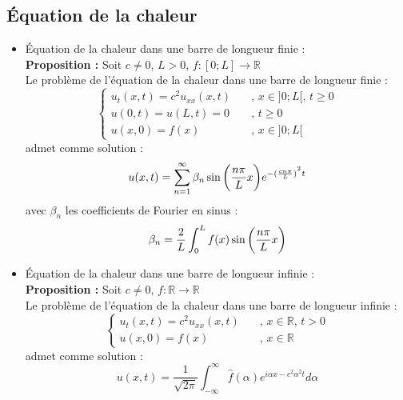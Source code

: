 \subsection{Équation de la chaleur}
\begin{itemize}
    \item Équation de la chaleur dans une barre de longueur finie : \\
    \textbf{Proposition :} Soit $c \neq 0$, $L > 0$, $f : [0;L] \to \mathbb{R}$ \\
    Le problème de l'équation de la chaleur dans une barre de longueur finie :
    $$
    \begin{cases}
        u_t(x,t) = c^2u_{xx}(x,t) \quad &\text{, }x \in ]0;L[\text{, }t \geq 0 \\
        u(0,t) = u(L,t) = 0 \quad &\text{, }t \geq 0 \\
        u(x,0) = f(x) \quad &\text{, }x \in ]0;L[
    \end{cases}
    $$
    admet comme solution :
    $$u(x,t) = \sum_{n=1}^{\infty}\beta_n \sin \bigg{(} \frac{n\pi}{L}x \bigg{)} e^{-(\frac{cn\pi}{L})^{^2} t}$$
    avec $\beta_n$ les coefficients de Fourier en sinus :
    $$\beta_n = \frac{2}{L} \int_0^Lf(x) \sin \bigg{(} \frac{n\pi}{L}x \bigg{)}$$
    \item Équation de la chaleur dans une barre de longueur infinie : \\
    \textbf{Proposition :} Soit $c \neq 0$, $f : \mathbb{R} \to \mathbb{R}$ \\
    Le problème de l'équation de la chaleur dans une barre de longueur infinie :
    $$
    \begin{cases}
        u_t(x,t) = c^2u_{xx}(x,t) \quad &\text{, }x \in \mathbb{R} \text{, }t > 0 \\
        u(x,0) = f(x) \quad &\text{, }x \in \mathbb{R}
    \end{cases}
    $$
    admet comme solution :
    $$u(x,t) = \frac{1}{\sqrt{2\pi}} \int_{-\infty}^{\infty} \widehat{f}(\alpha) e^{i\alpha x - c^2\alpha^2t} d\alpha$$
\end{itemize}

